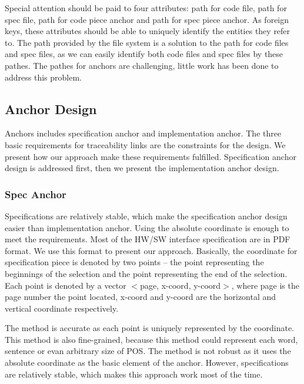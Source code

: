 Special attention should be paid to four attributes: path for code file, path for spec file, path for code piece anchor and path for spec piece anchor.
As foreign keys, these attributes should be able to uniquely identify the entities they refer to.
The path provided by the file system is a solution to the path for code files and spec files, as we can easily identify both code files and spec files by these pathes.
The pathes for anchors are challenging, little work has been done to address this problem.


\subsection{Anchor Design}

Anchors includes specification anchor and implementation anchor. The three basic requirements for traceability links are the constraints for the design. We present how our approach make these requirements fulfilled. Specification anchor design is addressed first, then we present the implementation anchor design.

\subsubsection{Spec Anchor}

Specifications are relatively stable, which make the specification anchor design easier than implementation anchor. Using the absolute coordinate is enough to meet the requirements. Most of the HW/SW interface specification are in PDF format. We use this format to present our approach. Basically, the coordinate for specification piece is denoted by two points -- the point representing the beginnings of the selection and the point representing the end of the selection. Each point is denoted by a vector $<$page, x-coord, y-coord$>$, where page is the page number the point located, x-coord and y-coord are the horizontal and vertical coordinate respectively.

The method is accurate as each point is uniquely represented by the coordinate. This method is also fine-grained, because this method could represent each word, sentence or evan arbitrary size of POS. The method is not robust as it uses the absolute coordinate as the basic element of the anchor. However, specifications are relatively stable, which makes this approach work most of the time.


